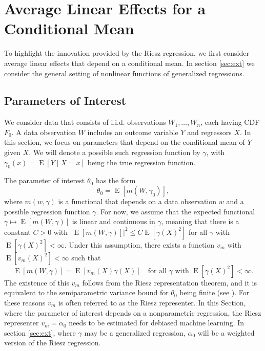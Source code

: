 \documentclass[aos]{imsart}
\numberwithin{equation}{section}
\theoremstyle{plain}
\theoremstyle{remark}
\DeclareMathOperator{\E}{E}
\begin{document}
\section{Average Linear Effects for a Conditional Mean}\label{sec:linear}
To highlight the innovation provided by the Riesz regression, we first consider average linear effects that depend on a conditional mean. 
In section \ref{sec:ext} we consider the general setting of nonlinear functions of generalized regressions.
\subsection{Parameters of Interest}
We consider data that consists of i.i.d. observations $W_1, \ldots, \allowbreak W_n$, each having CDF $F_0$. A data observation $W$ includes an outcome variable $Y$ and regressors $X$. In this section, we focus on parameters that depend on the conditional mean of $Y$ given $X$. We will denote a possible such regression function by $\gamma$, with $\gamma_0(x) = \E[Y \mid X = x]$ being the true regression function.

The parameter of interest $\theta_0$ has the form
\begin{equation}\label{eq:linmom}
    \theta_0 = \E[m(W, \gamma_0)],
\end{equation}
where $m(w, \gamma)$ is a functional that depends on a data observation $w$ and a possible regression function $\gamma$. For now, we assume that the expected functional $\gamma \mapsto \E[m(W, \gamma)]$ is linear and continuous in $\gamma$, meaning that there is a constant $C>0$ with $|\E[m(W, \gamma)]|^{2}\leq C\E[\gamma(X)^2]$ for all $\gamma$ with $\E[\gamma(X)^2] < \infty$. Under this assumption, there exists a function $v_m$ with $\E[v_m(X)^2] < \infty$ such that 
\begin{equation}\label{eq:rr}
    \E[m(W, \gamma)] = \E[v_m(X)\gamma(X)] \quad \text{for all } \gamma \text{ with } \E[\gamma(X)^2] < \infty.
\end{equation}
The existence of this $v_m$ follows from the Riesz representation theorem, and it is equivalent to the semiparametric variance bound for $\theta_0$ being finite (see \cite{newey1994asymptotic, hirshberg2021augmented, chernozhukov2019global}). For these reasons $v_m$ is often referred to as the Riesz representer. 
In this Section, where the parameter of interest depends on a nonparametric regression, the Riesz representer  $v_m = \alpha_0$ needs to be estimated for debiased machine learning. 
In section \ref{sec:ext}, where  $\gamma$ may be a generalized regression, $\alpha_0$ will be a weighted version of the Riesz regression.
\end{document}
